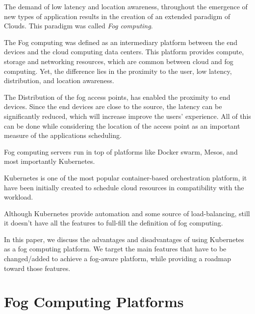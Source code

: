 \documentclass[letterpaper,twocolumn,10pt]{article}
\begin{document}
The demand of low latency and location awareness, throughout the emergence of new types of application results in the creation of an extended paradigm of     Clouds. This paradigm was called {\em Fog computing}\cite{bonomi2011connected,Bonomi:2012:FCR:2342509.2342513}.

The Fog computing was defined as an intermediary platform between the end devices and the cloud computing data centers. This platform provides compute, storage and networking resources, which are common between cloud and fog computing. Yet, the difference lies in the proximity to the user, low latency, distribution, and location awareness. 

The Distribution of the fog access points, has enabled the proximity to end devices. Since the end devices are close to the source, the latency can be significantly reduced, which will increase improve the users' experience. All of this can be done while considering the location of the access point as an important measure of the applications scheduling.

Fog computing servers run in top of platforms like Docker swarm, Mesos, and most importantly Kubernetes.

Kubernetes is one of the most popular container-based orchestration  platform, it have been initially created to schedule cloud resources in compatibility with the workload.

Although Kubernetes provide automation and some source of load-balancing, still it doesn't have all the features to full-fill the definition  of fog computing.    

In this paper, we discuss the advantages and disadvantages of using Kubernetes as a fog computing platform. We target the main features that have to be changed/added to achieve a fog-aware platform, while providing a roadmap toward those features.




\section{Fog Computing Platforms}
\end{document}
